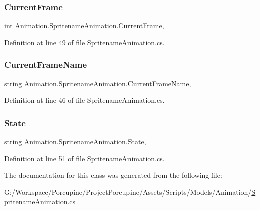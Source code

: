 \subsubsection{\texorpdfstring{Current\+Frame}{CurrentFrame}}
{\footnotesize\ttfamily int Animation.\+Spritename\+Animation.\+Current\+Frame\hspace{0.3cm}{\ttfamily [get]}, {\ttfamily [set]}}



Definition at line 49 of file Spritename\+Animation.\+cs.

\mbox{\label{class_animation_1_1_spritename_animation_af26dab62d982359259d848ab4d7b508e}} 
\subsubsection{\texorpdfstring{Current\+Frame\+Name}{CurrentFrameName}}
{\footnotesize\ttfamily string Animation.\+Spritename\+Animation.\+Current\+Frame\+Name\hspace{0.3cm}{\ttfamily [get]}, {\ttfamily [set]}}



Definition at line 46 of file Spritename\+Animation.\+cs.

\mbox{\label{class_animation_1_1_spritename_animation_aecae671061e80c3ac38bae5a47be754c}} 
\subsubsection{\texorpdfstring{State}{State}}
{\footnotesize\ttfamily string Animation.\+Spritename\+Animation.\+State\hspace{0.3cm}{\ttfamily [get]}, {\ttfamily [set]}}



Definition at line 51 of file Spritename\+Animation.\+cs.



The documentation for this class was generated from the following file\+:\begin{DoxyCompactItemize}
\item 
G\+:/\+Workspace/\+Porcupine/\+Project\+Porcupine/\+Assets/\+Scripts/\+Models/\+Animation/\hyperlink{_spritename_animation_8cs}{Spritename\+Animation.\+cs}\end{DoxyCompactItemize}
